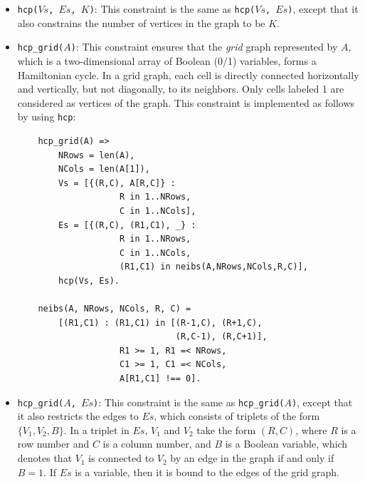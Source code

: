 \begin{itemize}
\begin{verbatim}
    subcircuit(L) =>
        N = len(L),
        L :: 1..N,
        Vs = [{I,B} : I in 1..N, 
                      B #<=> L[I] #!= I],
        Es = [{I,J,B} : I in 1..N, 
                        J in fd_dom(L[I]), 
                        J !== I, 
                        B #<=> L[I] #= J],
        hcp(Vs, Es).
\end{verbatim}

\item \texttt{hcp($Vs$, $Es$, $K$)}:  This constraint is the same as \texttt{hcp($Vs$, $Es$)}, except that it also constrains the number of vertices in the graph to be $K$. 

\item \texttt{hcp\_grid($A$)}:  This constraint ensures that the \textit{grid} graph represented by $A$, which is a two-dimensional array of Boolean (0/1) variables, forms a Hamiltonian cycle. In a grid graph, each cell is directly connected horizontally and vertically, but not diagonally, to its neighbors. Only cells labeled 1 are considered as vertices of the graph. This constraint is implemented as follows by using \texttt{hcp}:
\begin{verbatim}
    hcp_grid(A) =>
        NRows = len(A),
        NCols = len(A[1]),
        Vs = [{(R,C), A[R,C]} : 
                    R in 1..NRows, 
                    C in 1..NCols],
        Es = [{(R,C), (R1,C1), _} : 
                    R in 1..NRows, 
                    C in 1..NCols,
                    (R1,C1) in neibs(A,NRows,NCols,R,C)],
        hcp(Vs, Es).

    neibs(A, NRows, NCols, R, C) = 
        [(R1,C1) : (R1,C1) in [(R-1,C), (R+1,C), 
                               (R,C-1), (R,C+1)],
                    R1 >= 1, R1 =< NRows,
                    C1 >= 1, C1 =< NCols, 
                    A[R1,C1] !== 0].
\end{verbatim}

\item \texttt{hcp\_grid($A$, $Es$)}: This constraint is the same as \texttt{hcp\_grid($A$)}, except that it also restricts the edges to $Es$, which consists of triplets of the form $\{V_1,V_2,B\}$. In a triplet in $Es$, $V_1$ and $V_2$ take the form $(R, C)$, where $R$ is a row number and $C$ is a column number, and $B$ is a Boolean variable, which denotes that $V_1$ is connected to $V_2$  by an edge in the graph if and only if $B = 1$. If $Es$ is a variable, then it is bound to the edges of the grid graph.  


\end{itemize}
